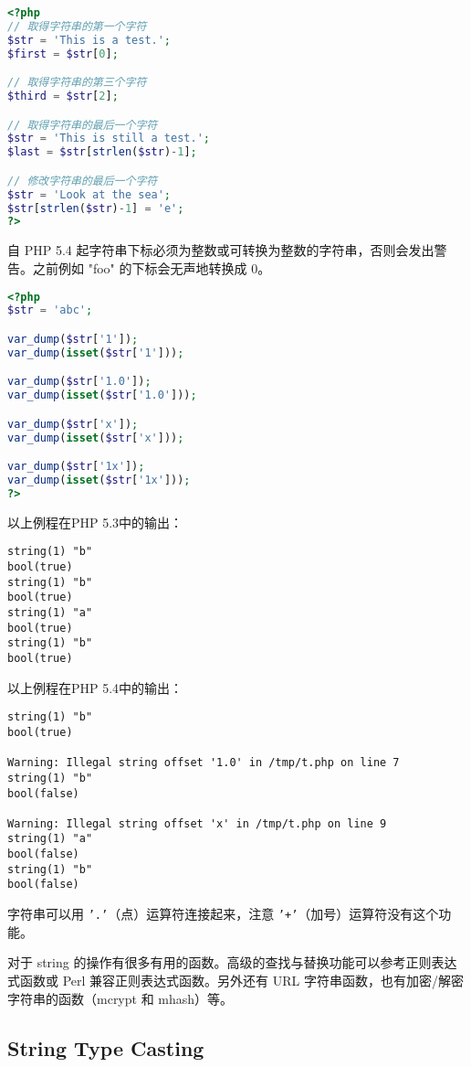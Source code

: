 \begin{lstlisting}[language=PHP]
<?php
// 取得字符串的第一个字符
$str = 'This is a test.';
$first = $str[0];

// 取得字符串的第三个字符
$third = $str[2];

// 取得字符串的最后一个字符
$str = 'This is still a test.';
$last = $str[strlen($str)-1]; 

// 修改字符串的最后一个字符
$str = 'Look at the sea';
$str[strlen($str)-1] = 'e';
?>
\end{lstlisting}

自 PHP 5.4 起字符串下标必须为整数或可转换为整数的字符串，否则会发出警告。之前例如 "foo" 的下标会无声地转换成 0。


\begin{lstlisting}[language=PHP]
<?php
$str = 'abc';

var_dump($str['1']);
var_dump(isset($str['1']));

var_dump($str['1.0']);
var_dump(isset($str['1.0']));

var_dump($str['x']);
var_dump(isset($str['x']));

var_dump($str['1x']);
var_dump(isset($str['1x']));
?>
\end{lstlisting}

以上例程在PHP 5.3中的输出：

\begin{verbatim}
string(1) "b"
bool(true)
string(1) "b"
bool(true)
string(1) "a"
bool(true)
string(1) "b"
bool(true)
\end{verbatim}

以上例程在PHP 5.4中的输出：

\begin{verbatim}
string(1) "b"
bool(true)

Warning: Illegal string offset '1.0' in /tmp/t.php on line 7
string(1) "b"
bool(false)

Warning: Illegal string offset 'x' in /tmp/t.php on line 9
string(1) "a"
bool(false)
string(1) "b"
bool(false)
\end{verbatim}

字符串可以用 \texttt{'.'}（点）运算符连接起来，注意 \texttt{'+'}（加号）运算符没有这个功能。

对于 string 的操作有很多有用的函数。高级的查找与替换功能可以参考正则表达式函数或 Perl 兼容正则表达式函数。另外还有 URL 字符串函数，也有加密/解密字符串的函数（mcrypt 和 mhash）等。

\subsection{String Type Casting}

